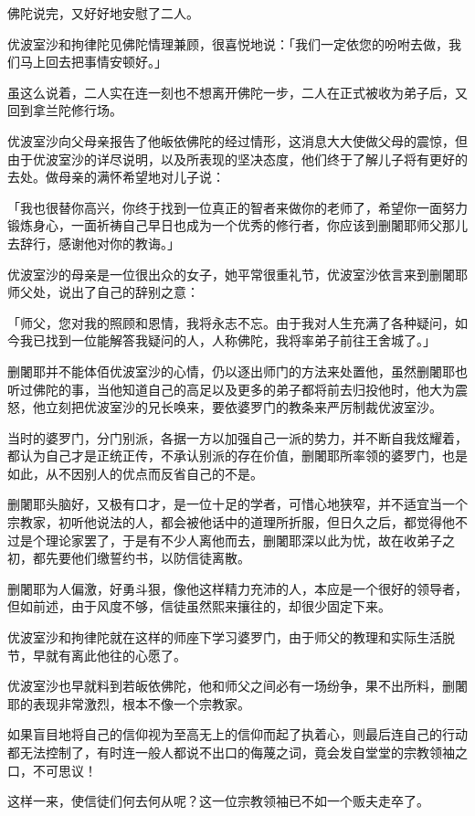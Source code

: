 \documentclass[twoside,openany]{book}
\begin{document}
佛陀说完，又好好地安慰了二人。

优波室沙和拘律陀见佛陀情理兼顾，很喜悦地说：「我们一定依您的吩咐去做，我们马上回去把事情安顿好。」

虽这么说着，二人实在连一刻也不想离开佛陀一步，二人在正式被收为弟子后，又回到拿兰陀修行场。

优波室沙向父母亲报告了他皈依佛陀的经过情形，这消息大大使做父母的震惊，但由于优波室沙的详尽说明，以及所表现的坚决态度，他们终于了解儿子将有更好的去处。做母亲的满怀希望地对儿子说：

「我也很替你高兴，你终于找到一位真正的智者来做你的老师了，希望你一面努力锻炼身心，一面祈祷自己早日也成为一个优秀的修行者，你应该到删闍耶师父那儿去辞行，感谢他对你的教诲。」

优波室沙的母亲是一位很出众的女子，她平常很重礼节，优波室沙依言来到删闍耶师父处，说出了自己的辞别之意：

「师父，您对我的照顾和恩情，我将永志不忘。由于我对人生充满了各种疑问，如今我已找到一位能解答我疑问的人，人称佛陀，我将率弟子前往王舍城了。」

删闍耶并不能体佰优波室沙的心情，仍以逐出师门的方法来处置他，虽然删闍耶也听过佛陀的事，当他知道自己的高足以及更多的弟子都将前去归投他时，他大为震怒，他立刻把优波室沙的兄长唤来，要依婆罗门的教条来严厉制裁优波室沙。

当时的婆罗门，分门别派，各据一方以加强自己一派的势力，并不断自我炫耀着，都认为自己才是正统正传，不承认别派的存在价值，删闍耶所率领的婆罗门，也是如此，从不因别人的优点而反省自己的不是。

删闍耶头脑好，又极有口才，是一位十足的学者，可惜心地狭窄，并不适宜当一个宗教家，初听他说法的人，都会被他话中的道理所折服，但日久之后，都觉得他不过是个理论家罢了，于是有不少人离他而去，删闍耶深以此为忧，故在收弟子之初，都先要他们缴誓约书，以防信徒离散。

删闍耶为人偏激，好勇斗狠，像他这样精力充沛的人，本应是一个很好的领导者，但如前述，由于风度不够，信徒虽然熙来攘往的，却很少固定下来。

优波室沙和拘律陀就在这样的师座下学习婆罗门，由于师父的教理和实际生活脱节，早就有离此他往的心愿了。

优波室沙也早就料到若皈依佛陀，他和师父之间必有一场纷争，果不出所料，删闍耶的表现非常激烈，根本不像一个宗教家。

如果盲目地将自己的信仰视为至高无上的信仰而起了执着心，则最后连自己的行动都无法控制了，有时连一般人都说不出口的侮蔑之词，竟会发自堂堂的宗教领袖之口，不可思议！

这样一来，使信徒们何去何从呢？这一位宗教领袖已不如一个贩夫走卒了。
\end{document}
